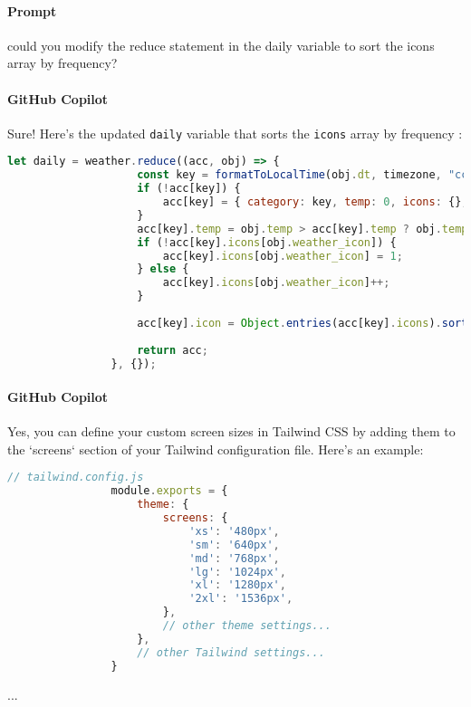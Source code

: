 \documentclass[FM,DP]{tulthesis}
\begin{document}
		\vspace{0.6em}
		\begin{tcolorbox}[colback=white,colframe=black,title=Efektivnější metody zpracování dat v JavaScriptu]
			\paragraph{Prompt}
			could you modify the reduce statement in the daily variable to sort the icons array by frequency?
			
			\vspace{0.6em}
			
			\paragraph{GitHub Copilot}
			Sure! Here's the updated \verb|daily| variable that sorts the \verb|icons| array by frequency \cite{map_reduce}:
			
			\vspace{0.6em}
			
			\begin{lstlisting}[language=JavaScript]
				let daily = weather.reduce((acc, obj) => {
					const key = formatToLocalTime(obj.dt, timezone, "cccc");
					if (!acc[key]) {
						acc[key] = { category: key, temp: 0, icons: {}, icon: ""};
					}
					acc[key].temp = obj.temp > acc[key].temp ? obj.temp : acc[key].temp;
					if (!acc[key].icons[obj.weather_icon]) {
						acc[key].icons[obj.weather_icon] = 1;
					} else {
						acc[key].icons[obj.weather_icon]++;
					}
					
					acc[key].icon = Object.entries(acc[key].icons).sort((a, b) => b[1] - a[1])[0][0];
					
					return acc;
				}, {});
			\end{lstlisting}
		\end{tcolorbox}
		
		\begin{tcolorbox}[colback=white,colframe=black,title=Implementace vlastních velikostí obrazovek do knihovny Tailwind]
			\paragraph{GitHub Copilot}
			Yes, you can define your custom screen sizes in Tailwind CSS by adding them to the `screens` section of your Tailwind configuration file. Here's an example:
			
			\vspace{0.6em}
			
			\begin{lstlisting}[language=JavaScript]
				// tailwind.config.js
				module.exports = {
					theme: {
						screens: {
							'xs': '480px',
							'sm': '640px',
							'md': '768px',
							'lg': '1024px',
							'xl': '1280px',
							'2xl': '1536px',
						},
						// other theme settings...
					},
					// other Tailwind settings...
				}
			\end{lstlisting}
			... \cite{tailwind}
		\end{tcolorbox}
		
\end{document}
